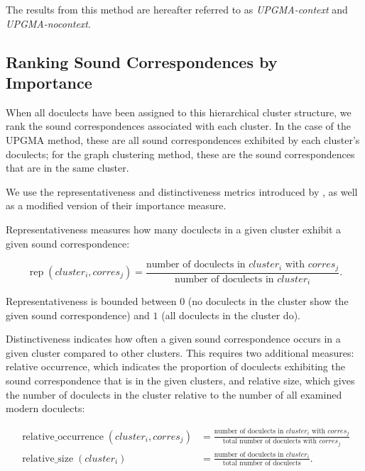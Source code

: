 \documentclass[a4paper]{article}
\begin{document}
The results from this method are hereafter referred to
as \textit{UPGMA-context} and \textit{UPGMA-nocontext}.

\subsection{Ranking Sound Correspondences by Importance}
\label{subsec:ranking}

When all doculects have been assigned to this hierarchical cluster structure,
we rank the sound correspondences associated with each cluster.
In the case of the UPGMA method, these are
all sound correspondences exhibited by each cluster's doculects;
for the graph clustering method,
these are the sound correspondences that are in the same cluster.

We use the representativeness and distinctiveness metrics
introduced by \citet{wieling2011bipartite},
as well as a modified version of their importance measure.

Representativeness measures how many doculects in a given cluster
exhibit a given sound correspondence:

\begin{equation*}
\operatorname{rep}(cluster_i, corres_j) = 
\frac{\text{number of doculects in } cluster_i \text{ with }  corres_j}
{\text{number of doculects in }  cluster_i}
.
\end{equation*}

Representativeness is bounded between
$0$ (no doculects in the cluster show the given sound correspondence)
and $1$ (all doculects in the cluster do).

Distinctiveness indicates how often a given sound correspondence
occurs in a given cluster compared to other clusters. 
This requires two additional measures:
relative occurrence, which indicates the proportion
of doculects exhibiting the sound correspondence
that is in the given clusters,
and relative size, which gives the number of doculects 
in the cluster relative to the number of all examined modern doculects:

\begin{align*}
\operatorname{relative\_occurrence}(cluster_i, corres_j) &= 
\frac{\text{number of doculects in } cluster_i \text{ with }  corres_j}
{\text{total number of doculects with } corres_j}\\
\operatorname{relative\_size}(cluster_i) &= 
\frac{\text{number of doculects in } cluster_i}
{\text{total number of doculects}}
.
\end{align*}
\end{document}
